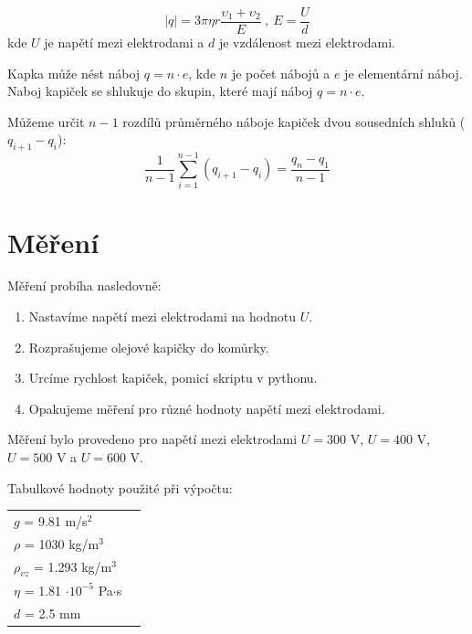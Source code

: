 \documentclass[a4paper,11pt]{article}
\begin{document}
    \hspace{10pt} 
    \begin{minipage}[t]{0.5\textwidth} 
            \begin{equation}
                |q| = 3 \pi \eta r \frac{\upsilon_1 + \upsilon_2}{E} ~ , ~ E = \frac{U}{d}
            \end{equation}
            kde $U$ je napětí mezi elektrodami a $d$ je vzdálenost mezi elektrodami.
            \par Kapka může nést náboj $q = n \cdot e$, kde $n$ je počet nábojů a $e$ je elementární náboj. Naboj kapiček se shlukuje do skupin, které mají náboj $q = n \cdot e$. 
            \par Můžeme určit $n-1$ rozdílů průměrného náboje kapiček dvou sousedních shluků ($q_{i+1} - q_i$):
            \begin{equation}
                \frac{1}{n-1} \sum_{i=1}^{n-1} (q_{i+1} - q_i) = \frac{q_n - q_1}{n-1}
            \end{equation}
        \section{Měření}
            Měření probíha nasledovně:
            \begin{enumerate}
                \item Nastavíme napětí mezi elektrodami na hodnotu $U$.
                \item Rozprašujeme olejové kapičky do komůrky.
                \item Urcíme rychlost kapiček, pomicí skriptu v pythonu\cite{vitek}.
                \item Opakujeme měření pro různé hodnoty napětí mezi elektrodami.
            \end{enumerate}
            \par Měření bylo provedeno pro napětí mezi elektrodami $U = 300$ V, $U = 400$ V, $U = 500$ V a $U = 600$ V.
            \par Tabulkové hodnoty použité při výpočtu:
            \begin{center}
                \begin{tabular}{ll}
                    $g$ = 9.81 m/s$^2$ \\
                    $\rho$ = 1030 kg/m$^3$ \\
                    $\rho_{vz}$ = 1.293 kg/m$^3$\cite{density} \\
                    $\eta$ = 1.81 $\cdot 10^{-5}$ Pa$\cdot$s\cite{viscosity} \\
                    $d$ = 2.5 mm \\
                \end{tabular}
            \end{center}
    \end{minipage}
\end{document}

